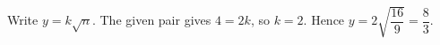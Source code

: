 Write $y=k\sqrt n$. The given pair gives $4=2k$, so $k=2$. Hence $y=2\sqrt{\dfrac{16}{9}}=\boxed{\dfrac{8}{3}}$.
